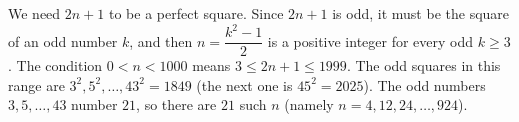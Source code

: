 We need $2n+1$ to be a perfect square. Since $2n+1$ is odd, it must be the square of an odd number $k$, and then $n=\dfrac{k^2-1}{2}$ is a positive integer for every odd $k\ge3$. The condition $0<n<1000$ means $3\le2n+1\le1999$. The odd squares in this range are $3^2,5^2,\dots,43^2=1849$ (the next one is $45^2=2025$). The odd numbers $3,5,\dots,43$ number $\boxed{21}$, so there are $21$ such $n$ (namely $n=4,12,24,\dots,924$).
